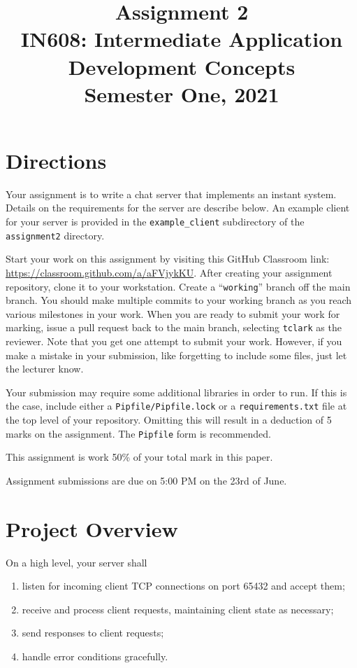 \documentclass{article}
\begin{document}
\title{Assignment 2\\IN608: Intermediate Application Development Concepts \\Semester One, 2021}
\date{}
\maketitle

\section*{Directions}
Your assignment is to write a chat server that implements an instant system. Details on the requirements for the server are describe below. An example
client for your server is provided in the \texttt{example\_client} subdirectory of the \texttt{assignment2} directory.

Start your work on this assignment by visiting this GitHub Classroom link: \url{https://classroom.github.com/a/aFVjykKU}. After creating your assignment repository, clone it to your workstation.  Create a ``\texttt{working}'' branch off the main branch.  You should make multiple commits to your working branch as you reach various milestones in your work. When you are ready to submit your work for marking, issue a pull request back to the main branch, selecting \texttt{tclark} as the reviewer. Note that you get one attempt to submit your work. However, if you make a mistake in your submission, like forgetting to include some files, just let the lecturer know.


Your submission may require some additional libraries in order to run. If this is the case, include either a \texttt{Pipfile/Pipfile.lock} or a \texttt{requirements.txt} file at the top level of your repository. Omitting this will result in a deduction of 5 marks on the assignment. The \texttt{Pipfile} form is recommended.

This assignment is work 50\% of your total mark in this paper.


Assignment submissions are due on 5:00 PM on the 23rd of June.

\section{Project Overview}

On a high level, your server shall
    \begin{enumerate}
      \item listen for incoming client TCP connections on port 65432 and accept them;
      \item receive and process client requests, maintaining client state as necessary;
      \item send responses to client requests;
      \item handle error conditions gracefully.
    \end{enumerate}   
    
\end{document}
